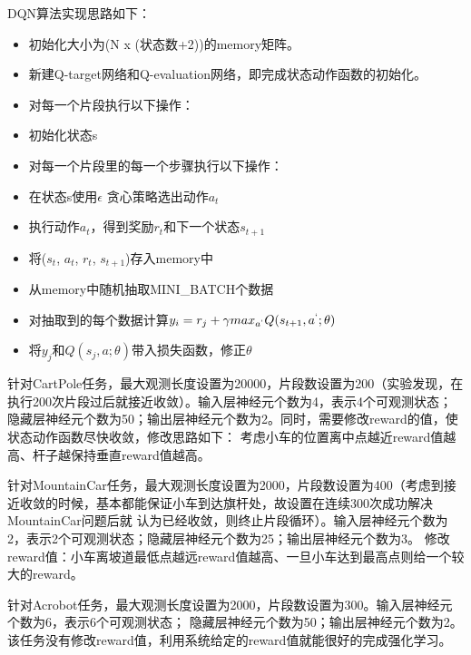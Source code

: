 \documentclass[a4paper,UTF8]{article}
\theoremstyle{definition}
\begin{document}
DQN算法实现思路如下：
\begin{itemize}
	\item 初始化大小为(N x (状态数+2))的memory矩阵。
	\item 新建Q-target网络和Q-evaluation网络，即完成状态动作函数的初始化。
	\item 对每一个片段执行以下操作：
	\item 初始化状态s
	\item 对每一个片段里的每一个步骤执行以下操作：
	\item 在状态s使用$\epsilon$ 贪心策略选出动作$a_t$
	\item 执行动作$a_t$，得到奖励$r_t$和下一个状态$s_{t+1}$
	\item 将($s_t$, $a_t$, $r_t$, $s_{t+1}$)存入memory中
	\item 从memory中随机抽取MINI\_BATCH个数据
	\item 对抽取到的每个数据计算$y_i = r_j + \gamma max_{a^`} Q(s_{t+1}, a^`; \theta)$
	\item 将$y_j$和$Q(s_j, a; \theta)$带入损失函数，修正$\theta$
\end{itemize}

针对CartPole任务，最大观测长度设置为20000，片段数设置为200（实验发现，在执行200次片段过后就接近收敛）。输入层神经元个数为4，表示4个可观测状态；
隐藏层神经元个数为50；输出层神经元个数为2。同时，需要修改reward的值，使状态动作函数尽快收敛，修改思路如下：
考虑小车的位置离中点越近reward值越高、杆子越保持垂直reward值越高。

针对MountainCar任务，最大观测长度设置为2000，片段数设置为400（考虑到接近收敛的时候，基本都能保证小车到达旗杆处，故设置在连续300次成功解决MountainCar问题后就
认为已经收敛，则终止片段循环）。输入层神经元个数为2，表示2个可观测状态；隐藏层神经元个数为25；输出层神经元个数为3。
修改reward值：小车离坡道最低点越远reward值越高、一旦小车达到最高点则给一个较大的reward。

针对Acrobot任务，最大观测长度设置为2000，片段数设置为300。输入层神经元个数为6，表示6个可观测状态；
隐藏层神经元个数为50；输出层神经元个数为2。该任务没有修改reward值，利用系统给定的reward值就能很好的完成强化学习。
\end{document}
